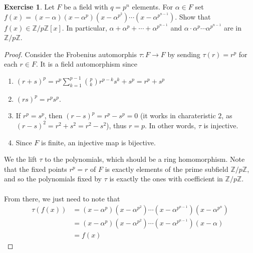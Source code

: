 \documentclass{article}
\theoremstyle{definition}
\newtheorem{exercise}{Exercise}
\begin{document}
\newpage

\begin{exercise}
Let $F$ be a field with $q = p^n$ elements. For $\alpha \in F$ set $f(x) = (x - \alpha) (x - \alpha^p) (x - \alpha^{p^2}) \cdots (x - \alpha^{p^{n - 1}})$. Show that $f(x) \in \mathbb{Z}/p \mathbb{Z}[x]$. In particular, $\alpha + \alpha^p + \cdots + \alpha^{p^{n - 1}}$ and $\alpha \cdot \alpha^p \cdots \alpha^{p^{n - 1}}$ are in $\mathbb{Z}/p \mathbb{Z}$.
\end{exercise}
\begin{proof}
Consider the Frobenius automorphis $\tau: F \to F$ by sending $\tau(r) = r^p$ for each $r \in F$. It is a field automorphism since
\begin{enumerate}
	\item $(r + s)^p = r^p \sum_{k = 1}^{p - 1} {p \choose k} r^{p - k} s^k + s^p = r^p + s^p$
	\item $(rs)^p = r^p s^p$.
	\item If $r^p = s^p$, then $(r - s)^p = r^p - s^p = 0$ (it works in charateristic $2$, as $(r - s)^2 = r^2 + s^2 = r^2 - s^2$), thus $r = p$. In other words, $\tau$ is injective.
	\item Since $F$ is finite, an injective map is bijective.
\end{enumerate}
We the lift $\tau$ to the polynomials, which should be a ring homomorphism. Note that the fixed points $r^p = r$ of $F$ is exactly elements of the prime subfield $\mathbb{Z}/p \mathbb{Z}$, and so the polynomials fixed by $\tau$ is exactly the ones with coefficient in $\mathbb{Z}/p \mathbb{Z}$.
\\
\\
From there, we just need to note that
\begin{align*}
\tau(f(x)) & = (x - \alpha^p) (x - \alpha^{p^2}) \cdots (x - \alpha^{p^{n - 1}}) (x - \alpha^{p^n}) \\
& = (x - \alpha^p) (x - \alpha^{p^2}) \cdots (x - \alpha^{p^{n - 1}}) (x - \alpha) \\
& = f(x)
\end{align*}
\end{proof}

\newpage
\end{document}
